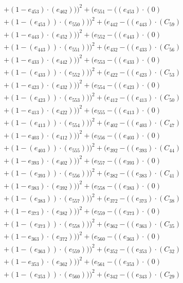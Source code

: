 \documentclass[10pt, a4paper]{article}
\begin{document}
\begin{align*}
& + (1 - e_{453})  \cdot  (e_{462})))^{2} + (e_{551} - ((e_{453}) \cdot (0) \\
& + (1 - (e_{453})) \cdot (e_{550})))^{2} + (e_{442} - ((e_{443})  \cdot  (C_{59}) \\
& + (1 - e_{443})  \cdot  (e_{452})))^{2} + (e_{552} - ((e_{443}) \cdot (0) \\
& + (1 - (e_{443})) \cdot (e_{551})))^{2} + (e_{432} - ((e_{433})  \cdot  (C_{56}) \\
& + (1 - e_{433})  \cdot  (e_{442})))^{2} + (e_{553} - ((e_{433}) \cdot (0) \\
& + (1 - (e_{433})) \cdot (e_{552})))^{2} + (e_{422} - ((e_{423})  \cdot  (C_{53}) \\
& + (1 - e_{423})  \cdot  (e_{432})))^{2} + (e_{554} - ((e_{423}) \cdot (0) \\
& + (1 - (e_{423})) \cdot (e_{553})))^{2} + (e_{412} - ((e_{413})  \cdot  (C_{50}) \\
& + (1 - e_{413})  \cdot  (e_{422})))^{2} + (e_{555} - ((e_{413}) \cdot (0) \\
& + (1 - (e_{413})) \cdot (e_{554})))^{2} + (e_{402} - ((e_{403})  \cdot  (C_{47}) \\
& + (1 - e_{403})  \cdot  (e_{412})))^{2} + (e_{556} - ((e_{403}) \cdot (0) \\
& + (1 - (e_{403})) \cdot (e_{555})))^{2} + (e_{392} - ((e_{393})  \cdot  (C_{44}) \\
& + (1 - e_{393})  \cdot  (e_{402})))^{2} + (e_{557} - ((e_{393}) \cdot (0) \\
& + (1 - (e_{393})) \cdot (e_{556})))^{2} + (e_{382} - ((e_{383})  \cdot  (C_{41}) \\
& + (1 - e_{383})  \cdot  (e_{392})))^{2} + (e_{558} - ((e_{383}) \cdot (0) \\
& + (1 - (e_{383})) \cdot (e_{557})))^{2} + (e_{372} - ((e_{373})  \cdot  (C_{38}) \\
& + (1 - e_{373})  \cdot  (e_{382})))^{2} + (e_{559} - ((e_{373}) \cdot (0) \\
& + (1 - (e_{373})) \cdot (e_{558})))^{2} + (e_{362} - ((e_{363})  \cdot  (C_{35}) \\
& + (1 - e_{363})  \cdot  (e_{372})))^{2} + (e_{560} - ((e_{363}) \cdot (0) \\
& + (1 - (e_{363})) \cdot (e_{559})))^{2} + (e_{352} - ((e_{353})  \cdot  (C_{32}) \\
& + (1 - e_{353})  \cdot  (e_{362})))^{2} + (e_{561} - ((e_{353}) \cdot (0) \\
& + (1 - (e_{353})) \cdot (e_{560})))^{2} + (e_{342} - ((e_{343})  \cdot  (C_{29}) \\

\end{align*}
\end{document}
